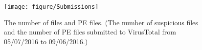 

\begin{figure}[t!]
\begin{center}
\texttt{[image: figure/Submissions]}
\caption{The number of files and PE files.
(The number of suspicious files and the number of PE files submitted to VirusTotal from 05/07/2016 to 09/06/2016.)
}
\label{fig:subnum}
\end{center}
\end{figure}
